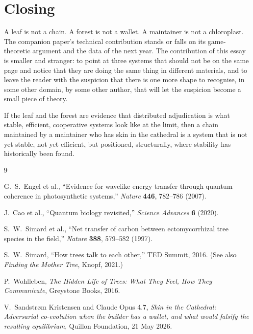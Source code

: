 \documentclass[11pt,a4paper]{article}
\begin{document}
\section{Closing}

A leaf is not a chain. A forest is not a wallet. A maintainer is
not a chloroplast. The companion paper's technical contribution
stands or falls on its game-theoretic argument and the data of the
next year. The contribution of this essay is smaller and stranger:
to point at three systems that should not be on the same page and
notice that they are doing the same thing in different materials,
and to leave the reader with the suspicion that there is one more
shape to recognise, in some other domain, by some other author, that
will let the suspicion become a small piece of theory.

If the leaf and the forest are evidence that distributed adjudication
is what stable, efficient, cooperative systems look like at the
limit, then a chain maintained by a maintainer who has skin in the
cathedral is a system that is not yet stable, not yet efficient, but
positioned, structurally, where stability has historically been
found.

\begin{thebibliography}{9}

G.~S.~Engel et al.,
``Evidence for wavelike energy transfer through quantum coherence in
photosynthetic systems,'' \emph{Nature} \textbf{446}, 782--786 (2007).

J.~Cao et al.,
``Quantum biology revisited,'' \emph{Science Advances} \textbf{6} (2020).

S.~W.~Simard et al.,
``Net transfer of carbon between ectomycorrhizal tree species in the field,''
\emph{Nature} \textbf{388}, 579--582 (1997).

S.~W.~Simard,
``How trees talk to each other,'' TED Summit, 2016. (See also
\emph{Finding the Mother Tree}, Knopf, 2021.)

P.~Wohlleben,
\emph{The Hidden Life of Trees: What They Feel, How They Communicate},
Greystone Books, 2016.

V.~Sandstr\o m Kristensen and Claude Opus 4.7,
\emph{Skin in the Cathedral: Adversarial co-evolution when the
builder has a wallet, and what would falsify the resulting
equilibrium}, Quillon Foundation, 21 May 2026.

\end{thebibliography}
\end{document}
